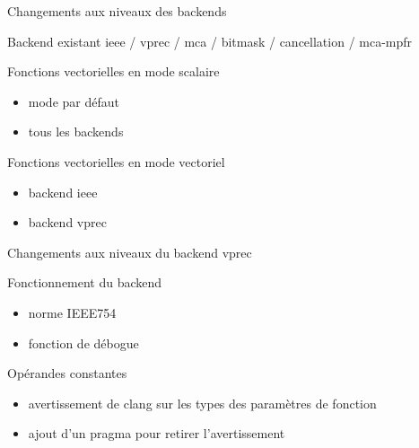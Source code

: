 \documentclass{beamer}
\begin{document}
\begin{frame}{Changements aux niveaux des backends}

  \begin{block}{Backend existant}
    ieee / vprec / mca / bitmask / cancellation / mca-mpfr
  \end{block}

  \begin{block}{Fonctions vectorielles en mode scalaire}
    \begin{itemize}
    \item mode par défaut
    \item tous les backends
    \end{itemize}
  \end{block}

  \begin{block}{Fonctions vectorielles en mode vectoriel}
    \begin{itemize}
    \item backend ieee
    \item backend vprec
    \end{itemize}
  \end{block}

\end{frame}

\begin{frame}{Changements aux niveaux du backend vprec}

  \begin{block}{Fonctionnement du backend}
    \begin{itemize}
    \item norme IEEE754
    \item fonction de débogue
    \end{itemize}
  \end{block}

  \begin{block}{Opérandes constantes}
    \begin{itemize}
    \item avertissement de clang sur les types des paramètres de fonction
    \item ajout d'un pragma pour retirer l'avertissement
    \end{itemize}
  \end{block}

\end{frame}
\end{document}
